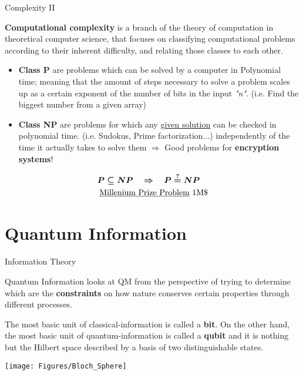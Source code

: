 \documentclass[9pt, handout, aspectratio=169]{beamer}	%
\begin{document}
\begin{frame}{Complexity II}

	\textbf{Computational complexity} is a branch of the theory of computation in theoretical computer science, that focuses on classifying computational problems according to their inherent difficulty, and relating those classes to each other. \pause

	\begin{itemize}
		\item \textbf{Class P} are problems which can be solved by a computer in Polynomial time; meaning that the amount of steps necessary to solve a problem scales up as a certain exponent of the number of bits in the input \emph{"n"}. (i.e. Find the biggest number from a given array) \pause
		\item \textbf{Class NP} are problems for which any \underline{given solution} can be checked in polynomial time. (i.e. Sudokus, Prime factorization...) independently of the time it actually takes to solve them $\Rightarrow$ Good problems for \textbf{encryption systems}!
	\end{itemize}

	\pause

	\vspace{-8pt}
	\begin{align*}
		\boldsymbol{P \subseteq NP \quad \Rightarrow \quad P \overset{?}{=} NP \quad } \\
		\text{\underline{Millenium Prize Problem} 1M\$}
	\end{align*}
	\vspace{-20pt}

\end{frame}




\section{Quantum Information}

\begin{frame}{Information Theory}

	Quantum Information looks at QM from the perspective of trying to determine which are the \textbf{constraints} on how nature conserves certain properties through different processes.

	\begin{multicols}{2}

		The most basic unit of classical-information is called a \textbf{bit}. On the other hand, the most basic unit of quantum-information is called a \textbf{qubit} and it is nothing but the Hilbert space described by a basis of two distinguishable states.

		\columnbreak
		\begin{center}
	\texttt{[image: Figures/Bloch\_Sphere]}
		\end{center}

	\end{multicols}

\end{frame}
\end{document}
